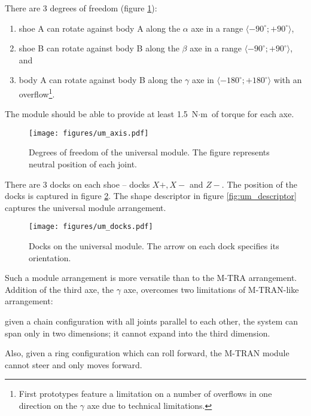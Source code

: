 There are 3 degrees of freedom (figure \ref{fig:um_axis}):
\begin{enumerate}
    \item shoe A can rotate against body A along the $\alpha$ axe in a range
    $\langle -90^\circ; +90^\circ\rangle$,
    \item shoe B can rotate against body B along the $\beta$ axe in a range
    $\langle -90^\circ; +90^\circ\rangle$, and
    \item body A can rotate against body B along the $\gamma$ axe in $\langle
    -180^\circ; +180^\circ\rangle$ with an overflow\footnote{First prototypes
    feature a limitation on a number of overflows in one direction on the
    $\gamma$ axe due to technical limitations. }.
\end{enumerate}
The module should be able to provide at least 1.5 $\text{N}\cdot\text{m}$ of
torque for each axe.

\begin{figure}
    \centering
    \texttt{[image: figures/um\_axis.pdf]}
    \caption{Degrees of freedom of the universal module. The figure represents
    neutral position of each joint.}
    \label{fig:um_axis}
\end{figure}

There are 3 docks on each shoe -- docks $X+, X-$ and $Z-$. The position of the
docks is captured in figure \ref{fig:um_docks}. The shape descriptor in figure
\ref{fig:um_descriptor} captures the universal module arrangement.

\begin{figure}
    \centering
    \texttt{[image: figures/um\_docks.pdf]}
    \caption{Docks on the universal module. The arrow on each dock specifies its orientation.}
    \label{fig:um_docks}
\end{figure}

Such a module arrangement is more versatile than to the M-TRA arrangement.
Addition of the third axe, the $\gamma$ axe, overcomes two limitations of
M-TRAN-like arrangement:
\begin{enumerate*}
    \item given a chain configuration with all joints parallel to each other,
    the system can span only in two dimensions; it cannot expand into the third
    dimension.
    \item Also, given a ring configuration which can roll forward, the M-TRAN
    module cannot steer and only moves forward.
\end{enumerate*}


